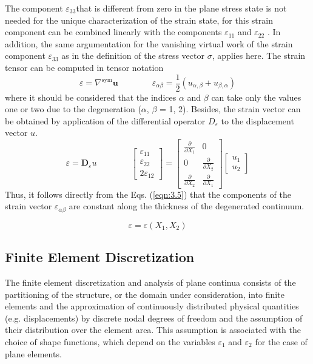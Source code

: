 The component $\varepsilon_{ 33 }$that is different from zero in the plane stress state is not needed for the unique characterization of the strain state, for this strain component can be combined linearly with the components $\varepsilon_{ 11}$ and $\varepsilon_{ 22}$ . In addition, the same argumentation
for the vanishing virtual work of the strain component $\varepsilon_{ 33}$ as in the definition of the stress vector
$\sigma$, applies here. The strain tensor can be computed in tensor notation
\begin{equation}
\label{eqn:3.11}
 \varepsilon=\nabla^{\mathrm{sym}} \boldsymbol{u} \qquad \qquad \varepsilon_{\alpha \beta}=\frac{1}{2}\left(u_{\alpha, \beta}+u_{\beta, \alpha}\right) 
\end{equation}
where it should be considered that the indices $\alpha$ and $\beta$ can take only the values one or two due to the degeneration ($\alpha$, $\beta$ = 1, 2). Besides, the strain vector can be obtained by application of the differential operator $D_\varepsilon$ to the displacement vector $u$.
\begin{equation}
\label{eqn:3.12}
 \varepsilon=\mathbf{D}_{\varepsilon} u \qquad \qquad
 \left[\begin{array}{c}\varepsilon_{11} \\ \varepsilon_{22} \\ 2 \varepsilon_{12}\end{array}\right]=\left[\begin{array}{cc}\frac{\partial}{\partial X_{1}} & 0 \\ 0 & \frac{\partial}{\partial X_{2}} \\ \frac{\partial}{\partial X_{2}} & \frac{\partial}{\partial X_{1}}\end{array}\right]\left[\begin{array}{l}u_{1} \\ u_{2}\end{array}\right] 
\end{equation}
Thus, it follows directly from the Eqs. (\ref{eqn:3.5}) that the components of the strain vector $\varepsilon_{\alpha \beta}$ are constant along the thickness of the degenerated continuum.

\begin{equation}
\label{eqn:3.13}
 \varepsilon=\varepsilon\left(X_{1}, X_{2}\right) 
\end{equation}
\subsection{Finite Element Discretization}
The finite element discretization and analysis of plane continua consists of the partitioning of
the structure, or the domain under consideration, into finite elements and the approximation
of continuously distributed physical quantities (e.g. displacements) by discrete nodal degrees
of freedom and the assumption of their distribution over the element area. This assumption is
associated with the choice of shape functions, which depend on the variables $\varepsilon_1$ and $\varepsilon_2$ for the case of plane elements.


